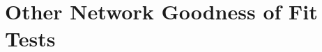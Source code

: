\documentclass[12pt,pdflatex]{elsarticle}
\begin{document}
%
%
%

\clearpage
\section*{Other Network Goodness of Fit Tests}
\label{sec:otherNetGof}
\end{document}
